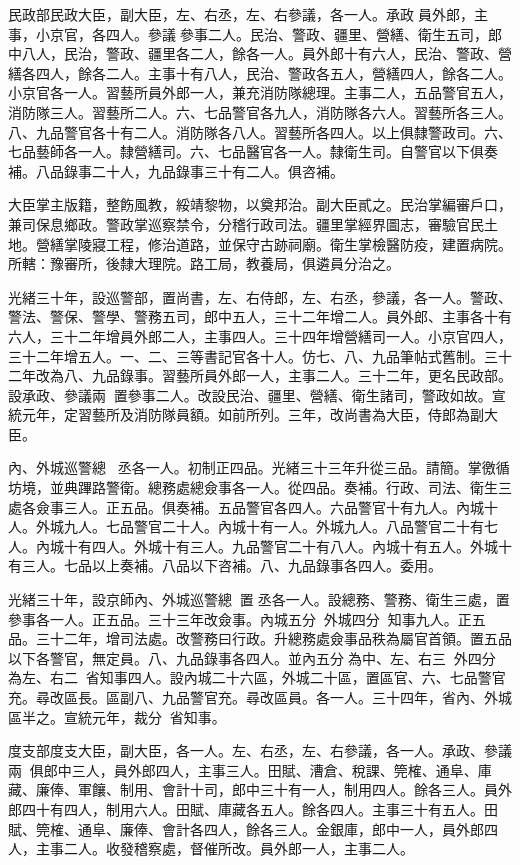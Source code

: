 \begin{pinyinscope}
民政部民政大臣，副大臣，左、右丞，左、右參議，各一人。承政員外郎，主事，小京官，各四人。參議參事二人。民治、警政、疆里、營繕、衛生五司，郎中八人，民治，警政、疆里各二人，餘各一人。員外郎十有六人，民治、警政、營繕各四人，餘各二人。主事十有八人，民治、警政各五人，營繕四人，餘各二人。小京官各一人。習藝所員外郎一人，兼充消防隊總理。主事二人，五品警官五人，消防隊三人。習藝所二人。六、七品警官各九人，消防隊各六人。習藝所各三人。八、九品警官各十有二人。消防隊各八人。習藝所各四人。以上俱隸警政司。六、七品藝師各一人。隸營繕司。六、七品醫官各一人。隸衛生司。自警官以下俱奏補。八品錄事二十人，九品錄事三十有二人。俱咨補。

大臣掌主版籍，整飭風教，綏靖黎物，以奠邦治。副大臣貳之。民治掌編審戶口，兼司保息鄉政。警政掌巡察禁令，分稽行政司法。疆里掌經界圖志，審驗官民土地。營繕掌陵寢工程，修治道路，並保守古跡祠廟。衛生掌檢醫防疫，建置病院。所轄：豫審所，後隸大理院。路工局，教養局，俱遴員分治之。

光緒三十年，設巡警部，置尚書，左、右侍郎，左、右丞，參議，各一人。警政、警法、警保、警學、警務五司，郎中五人，三十二年增二人。員外郎、主事各十有六人，三十二年增員外郎二人，主事四人。三十四年增營繕司一人。小京官四人，三十二年增五人。一、二、三等書記官各十人。仿七、八、九品筆帖式舊制。三十二年改為八、九品錄事。習藝所員外郎一人，主事二人。三十二年，更名民政部。設承政、參議兩，置參事二人。改設民治、疆里、營繕、衛生諸司，警政如故。宣統元年，定習藝所及消防隊員額。如前所列。三年，改尚書為大臣，侍郎為副大臣。

內、外城巡警總，丞各一人。初制正四品。光緒三十三年升從三品。請簡。掌徼循坊境，並典蹕路警衛。總務處總僉事各一人。從四品。奏補。行政、司法、衛生三處各僉事三人。正五品。俱奏補。五品警官各四人。六品警官十有九人。內城十人。外城九人。七品警官二十人。內城十有一人。外城九人。八品警官二十有七人。內城十有四人。外城十有三人。九品警官二十有八人。內城十有五人。外城十有三人。七品以上奏補。八品以下咨補。八、九品錄事各四人。委用。

光緒三十年，設京師內、外城巡警總，置丞各一人。設總務、警務、衛生三處，置參事各一人。正五品。三十三年改僉事。內城五分，外城四分，知事九人。正五品。三十二年，增司法處。改警務曰行政。升總務處僉事品秩為屬官首領。置五品以下各警官，無定員。八、九品錄事各四人。並內五分為中、左、右三，外四分為左、右二，省知事四人。設內城二十六區，外城二十區，置區官、六、七品警官充。尋改區長。區副八、九品警官充。尋改區員。各一人。三十四年，省內、外城區半之。宣統元年，裁分，省知事。

度支部度支大臣，副大臣，各一人。左、右丞，左、右參議，各一人。承政、參議兩，俱郎中三人，員外郎四人，主事三人。田賦、漕倉、稅課、筦榷、通阜、庫藏、廉俸、軍饟、制用、會計十司，郎中三十有一人，制用四人。餘各三人。員外郎四十有四人，制用六人。田賦、庫藏各五人。餘各四人。主事三十有五人。田賦、筦榷、通阜、廉俸、會計各四人，餘各三人。金銀庫，郎中一人，員外郎四人，主事二人。收發稽察處，督催所改。員外郎一人，主事二人。


\end{pinyinscope}
